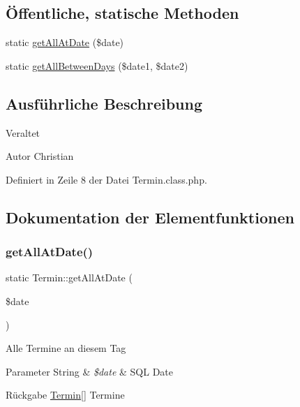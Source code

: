 \subsection*{Öffentliche, statische Methoden}
\begin{DoxyCompactItemize}
\item 
static \mbox{\hyperlink{interface_termin_ae3de2ba7c4262d588bb9190f51456c38}{get\+All\+At\+Date}} (\$date)
\item 
static \mbox{\hyperlink{interface_termin_ab8fc2d7a5e328d9dbab94f469e6d23e5}{get\+All\+Between\+Days}} (\$date1, \$date2)
\end{DoxyCompactItemize}


\subsection{Ausführliche Beschreibung}
\begin{DoxyRefDesc}{Veraltet}
\item[\mbox{\hyperlink{deprecated__deprecated000018}{Veraltet}}]\end{DoxyRefDesc}
\begin{DoxyAuthor}{Autor}
Christian 
\end{DoxyAuthor}


Definiert in Zeile 8 der Datei Termin.\+class.\+php.



\subsection{Dokumentation der Elementfunktionen}
\mbox{\label{interface_termin_ae3de2ba7c4262d588bb9190f51456c38}} 
\subsubsection{\texorpdfstring{get\+All\+At\+Date()}{getAllAtDate()}}
{\footnotesize\ttfamily static Termin\+::get\+All\+At\+Date (\begin{DoxyParamCaption}\item[{}]{\$date }\end{DoxyParamCaption})\hspace{0.3cm}{\ttfamily [static]}}

Alle Termine an diesem Tag 
\begin{DoxyParams}[1]{Parameter}
String & {\em \$date} & S\+QL Date \\
\hline
\end{DoxyParams}
\begin{DoxyReturn}{Rückgabe}
\mbox{\hyperlink{interface_termin}{Termin}}\mbox{[}\mbox{]} Termine 
\end{DoxyReturn}
\mbox{\label{interface_termin_ab8fc2d7a5e328d9dbab94f469e6d23e5}} 
